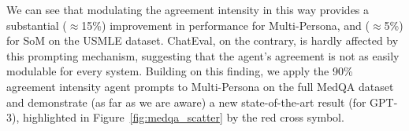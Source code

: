 \documentclass{article}  %
\begin{document}
We can see that modulating the agreement intensity in this way provides a substantial ($\approx$15\%) improvement in performance for Multi-Persona, and ($\approx$5\%) for SoM on the USMLE dataset. ChatEval, on the contrary, is hardly affected by this prompting mechanism, suggesting that the agent's agreement is not as easily modulable for every system.
Building on this finding, we apply the 90\% agreement intensity agent prompts to Multi-Persona on the full MedQA dataset and demonstrate (as far as we are aware) a new state-of-the-art result (for GPT-3), highlighted in Figure~\ref{fig:medqa_scatter} by the red cross symbol. 



\end{document}
